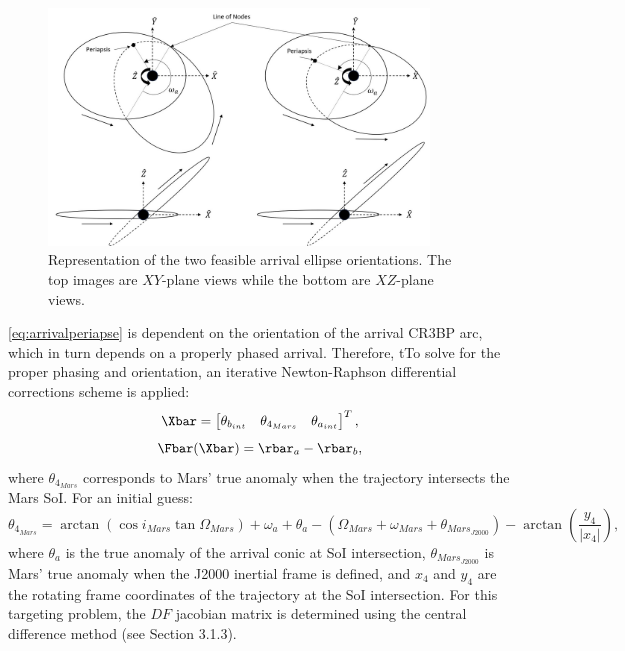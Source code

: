\begin{figure}[ht]
    \centering
    \includegraphics[width=0.9\textwidth]{figures/orientation.jpg}
    \caption{Representation of the two feasible arrival ellipse orientations. The top images are $XY$-plane views while the bottom are $XZ$-plane views.}
    \label{fig:orientation}
\end{figure}

\cref{eq:arrivalperiapse} is dependent on the orientation of the arrival CR3BP arc, which in turn
depends on a properly phased arrival. Therefore, tTo solve for the proper phasing and orientation,
an iterative Newton-Raphson differential corrections scheme is applied:
\begin{equation}
    \Xbar=\begin{bmatrix}   \theta_{b_{int}}    &   \theta_{4_{Mars}}   &   \theta_{a_{int}}    \end{bmatrix}^{T},
    \label{eq:MMATfreevar}
\end{equation}
\begin{equation}
    \Fbar(\Xbar)=\rbar_{a}-\rbar_{b},
    \label{eq:MMATconst}
\end{equation}
where $\theta_{4_{Mars}}$ corresponds to Mars' true anomaly when the trajectory intersects the Mars
SoI. For an initial guess:
\begin{equation}
    \theta_{4_{Mars}}=\arctan(\cos i_{Mars}\tan\Omega_{Mars})+\omega_{a}+\theta_{a}-(\Omega_{Mars}+\omega_{Mars}+\theta_{Mars_{J2000}})-\arctan(\frac{y_{4}}{|x_{4}|}),
    \label{eq:arrivalepoch}
\end{equation}
where $\theta_{a}$ is the true anomaly of the arrival conic at SoI intersection,
$\theta_{Mars_{J2000}}$ is Mars' true anomaly when the J2000 inertial frame is defined, and $x_{4}$
and $y_{4}$ are the rotating frame coordinates of the trajectory at the SoI intersection. For this
targeting problem, the $DF$ jacobian matrix is determined using the central difference method (see
Section 3.1.3).

